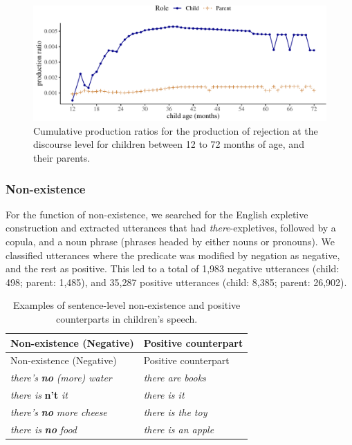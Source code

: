 \documentclass[
  man,floatsintext]{apa6}
\begin{document}
\begin{figure}[H]

{\centering \includegraphics{neg_construction_article_files/figure-latex/emotiondiscourse-1} 

}

\caption{Cumulative production ratios for the production of rejection at the discourse level for children between 12 to 72 months of age, and their parents.}\label{fig:emotiondiscourse}
\end{figure}

\subsubsection{Non-existence}\label{non-existence}

For the function of non-existence, we searched for the English expletive construction and extracted utterances that had \emph{there}-expletives, followed by a copula, and a noun phrase (phrases headed by either nouns or pronouns). We classified utterances where the predicate was modified by negation as negative, and the rest as positive. This led to a total of 1,983 negative utterances (child: 498; parent: 1,485), and 35,287 positive utterances (child: 8,385; parent: 26,902).

\begin{longtable}[]{@{}ll@{}}
\caption{\label{tab:nonexist} Examples of sentence-level non-existence and positive counterparts in children's speech.}\tabularnewline
\toprule\noalign{}
Non-existence (Negative) & Positive counterpart \\
\midrule\noalign{}
\endfirsthead
\toprule\noalign{}
Non-existence (Negative) & Positive counterpart \\
\midrule\noalign{}
\endhead
\bottomrule\noalign{}
\endlastfoot
\emph{there's} \textbf{\emph{no}} \emph{(more) water} & \emph{there are books} \\
\emph{there is} \textbf{n't} \emph{it} & \emph{there is it} \\
\emph{there's} \textbf{\emph{no}} \emph{more cheese} & \emph{there is the toy} \\
\emph{there is} \textbf{\emph{no}} \emph{food} & \emph{there is an apple} \\
\end{longtable}
\end{document}
